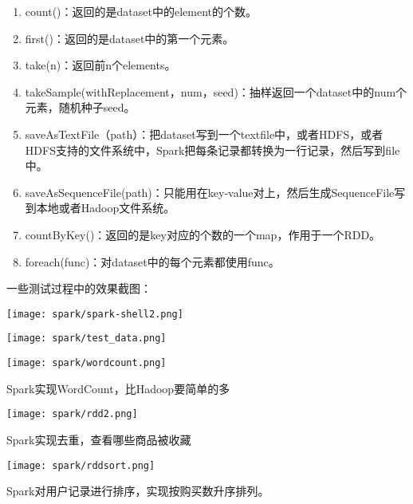 \begin{itemize}
\begin{enumerate}[1)]
\item count()：返回的是dataset中的element的个数。
\item first()：返回的是dataset中的第一个元素。
\item take(n)：返回前n个elements。
\item takeSample(withReplacement，num，seed)：抽样返回一个dataset中的num个元素，随机种子seed。
\item saveAsTextFile（path）：把dataset写到一个textfile中，或者HDFS，或者HDFS支持的文件系统中，Spark把每条记录都转换为一行记录，然后写到file中。
\item saveAsSequenceFile(path)：只能用在key-value对上，然后生成SequenceFile写到本地或者Hadoop文件系统。
\item countByKey()：返回的是key对应的个数的一个map，作用于一个RDD。
\item foreach(func)：对dataset中的每个元素都使用func。
\end{enumerate}
\end{itemize}



一些测试过程中的效果截图：

\begin{center}
    \texttt{[image: spark/spark-shell2.png]}    
\end{center}
    
\begin{center}
    \texttt{[image: spark/test\_data.png]}
\end{center}



\begin{center}
    \texttt{[image: spark/wordcount.png]}

    Spark实现WordCount，比Hadoop要简单的多
\end{center}
    
\begin{center}
    \texttt{[image: spark/rdd2.png]}

    Spark实现去重，查看哪些商品被收藏
\end{center}
    


\begin{center}
    \texttt{[image: spark/rddsort.png]}

    Spark对用户记录进行排序，实现按购买数升序排列。
\end{center}
    
